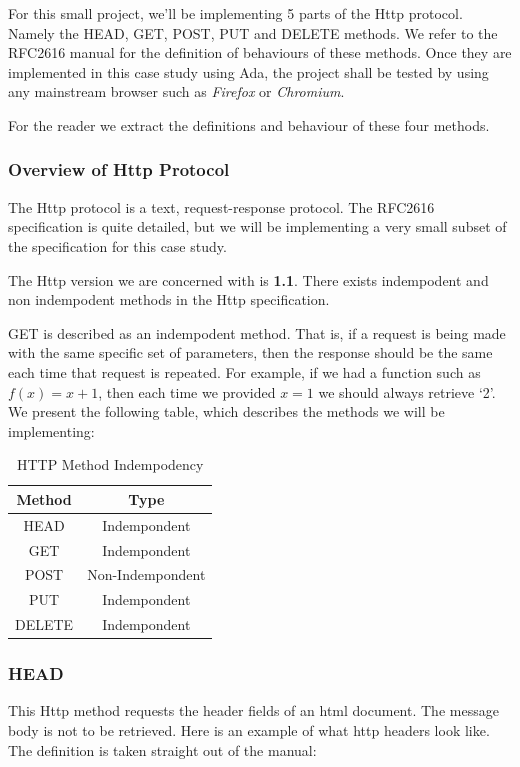 For this small project, we'll be implementing 5 parts of the Http protocol. 
Namely the HEAD, GET, POST, PUT and DELETE methods. We refer to the RFC2616 manual \cite{RFC2616}
for the definition of behaviours of these methods. Once they are implemented in
this case study using Ada, the project shall be tested by using any mainstream 
browser such as \textit{Firefox} or \textit{Chromium}.

For the reader we extract the definitions and behaviour of these four methods.
\subsubsection{Overview of Http Protocol}
The Http protocol is a text, request-response protocol. The RFC2616 specification is quite detailed, but we will be implementing a very small subset of the specification for this case study.

The Http version we are concerned with is \textbf{1.1}. There exists indempodent and non indempodent methods in the Http specification. 

GET is described as an indempodent method. That is, if a request is being made with the same specific set of parameters, then the response should be the same each time that request is repeated. For example, if we had a function such as $ f(x) = x + 1 $, then each time we provided $ x = 1 $ we should always retrieve `2'. We present the following table, which describes the methods we will be implementing:
\\
\begin{table} 
\begin{center}
\begin{tabular}{| c | c |}
\hline
\textbf{Method} & \textbf{Type} \\ \hline \hline
HEAD   & Indempondent \\
GET    & Indempondent \\
POST   & Non-Indempondent \\
PUT    & Indempondent \\ 
DELETE & Indempondent \\
\hline
\end{tabular}
\end{center}
\caption{HTTP Method Indempodency}
\end{table}
\subsubsection{HEAD}
This Http method requests the header fields of an html document. The message body is not to be retrieved. Here is an example of what http headers look like. The definition is taken straight out of the manual:  


